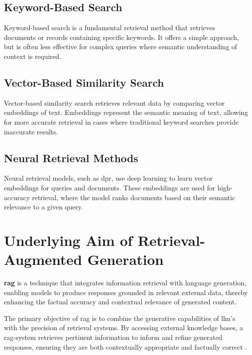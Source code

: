 \subsection{Keyword-Based Search}\label{sec:keyword-search}
Keyword-based search is a fundamental retrieval method that retrieves documents or records containing specific keywords. 
It offers a simple approach, but is often less effective for complex queries where semantic understanding of context is required.

\subsection{Vector-Based Similarity Search}\label{sec:vector-similarity-search}
Vector-based similarity search retrieves relevant data by comparing vector embeddings of text. 
Embeddings represent the semantic meaning of text, allowing for more accurate retrieval in cases where traditional keyword searches provide inaccurate results.

\subsection{Neural Retrieval Methods}\label{sec:neural-retrieval}
Neural retrieval models, such as \ac{dpr}, use deep learning to learn vector embeddings for queries and documents. 
These embeddings are used for high-accuracy retrieval, where the model ranks documents based on their semantic relevance to a given query.

\section{Underlying Aim of Retrieval-Augmented Generation}\label{sec:aim-of-rag}

\begin{definition}\label{def:rag}
    \textbf{\ac{rag}} is a technique that integrates information retrieval with language generation, enabling models to produce responses grounded in relevant external data, thereby enhancing the factual accuracy and contextual relevance of generated content.
\end{definition}

The primary objective of \ac{rag} is to combine the generative capabilities of \ac{llm}'s with the precision of retrieval systems. 
By accessing external knowledge bases, a \ac{rag}-system retrieves pertinent information to inform and refine generated responses, ensuring they are both contextually appropriate and factually correct \citep{Lewis2020}.



